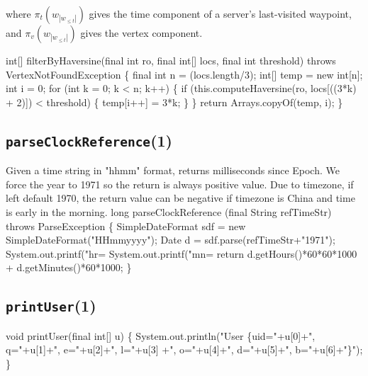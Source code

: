 \noindent
where $\pi_t(w_{|w_{\leq t}|})$ gives the time component of a server's
last-visited waypoint, and $\pi_v(w_{|w_{\leq t}|})$ gives the vertex
component.

\nwenddocs{}\endmoddef{}
int[] filterByHaversine(final int ro, final int[] locs, final int threshold)
throws VertexNotFoundException \{
  final int n = (locs.length/3);
  int[] temp = new int[n];
  int i = 0;
  for (int k = 0; k < n; k++) \{
    if (this.computeHaversine(ro, locs[((3*k) + 2)]) < threshold) \{
      temp[i++] = 3*k;
    \}
  \}
  return Arrays.copyOf(temp, i);
\}
\eatline
{}\nwendcode{}\nwdocspar
\subsection{\texttt{parseClockReference}(1)}
Given a time string in "hhmm" format, returns milliseconds since Epoch.  We
force the year to 1971 so the return is always positive value. Due to timezone,
if left default 1970, the return value can be negative if timezone is China
and time is early in the morning.
\nwenddocs{}\endmoddef{}
long parseClockReference (final String refTimeStr) throws ParseException \{
  SimpleDateFormat sdf = new SimpleDateFormat("HHmmyyyy");
  Date d = sdf.parse(refTimeStr+"1971");
  System.out.printf("hr=%
  System.out.printf("mn=%
  return d.getHours()*60*60*1000 + d.getMinutes()*60*1000;
\}
\nwendcode{}\nwdocspar

\subsection{\texttt{printUser}(1)}
\nwenddocs{}\endmoddef{}
void printUser(final int[] u) \{
  System.out.println("User \{uid="+u[0]+", q="+u[1]+", e="+u[2]+", l="+u[3]
    +", o="+u[4]+", d="+u[5]+", b="+u[6]+"\}");
\}
\eatline
{}\nwendcode{}\nwdocspar
